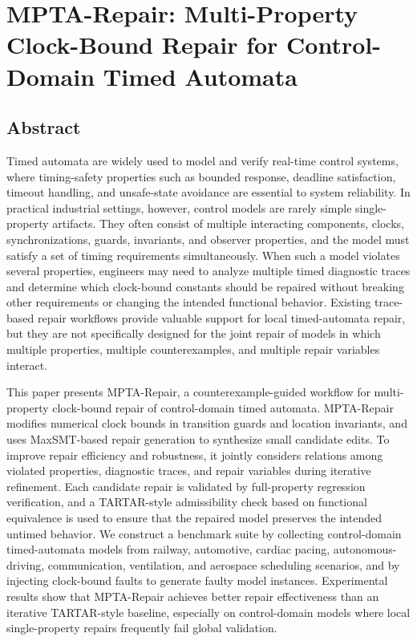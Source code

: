 \documentclass[
]{article}
\author{}
\date{}
\begin{document}
\section{MPTA-Repair: Multi-Property Clock-Bound Repair for
Control-Domain Timed
Automata}\label{mpta-repair-multi-property-clock-bound-repair-for-control-domain-timed-automata}

\subsection{Abstract}\label{abstract}

Timed automata are widely used to model and verify real-time control
systems, where timing-safety properties such as bounded response,
deadline satisfaction, timeout handling, and unsafe-state avoidance are
essential to system reliability. In practical industrial settings,
however, control models are rarely simple single-property artifacts.
They often consist of multiple interacting components, clocks,
synchronizations, guards, invariants, and observer properties, and the
model must satisfy a set of timing requirements simultaneously. When
such a model violates several properties, engineers may need to analyze
multiple timed diagnostic traces and determine which clock-bound
constants should be repaired without breaking other requirements or
changing the intended functional behavior. Existing trace-based repair
workflows provide valuable support for local timed-automata repair, but
they are not specifically designed for the joint repair of models in
which multiple properties, multiple counterexamples, and multiple repair
variables interact.

This paper presents MPTA-Repair, a counterexample-guided workflow for
multi-property clock-bound repair of control-domain timed automata.
MPTA-Repair modifies numerical clock bounds in transition guards and
location invariants, and uses MaxSMT-based repair generation to
synthesize small candidate edits. To improve repair efficiency and
robustness, it jointly considers relations among violated properties,
diagnostic traces, and repair variables during iterative refinement.
Each candidate repair is validated by full-property regression
verification, and a TARTAR-style admissibility check based on functional
equivalence is used to ensure that the repaired model preserves the
intended untimed behavior. We construct a benchmark suite by collecting
control-domain timed-automata models from railway, automotive, cardiac
pacing, autonomous-driving, communication, ventilation, and aerospace
scheduling scenarios, and by injecting clock-bound faults to generate
faulty model instances. Experimental results show that MPTA-Repair
achieves better repair effectiveness than an iterative TARTAR-style
baseline, especially on control-domain models where local
single-property repairs frequently fail global validation.
\end{document}
